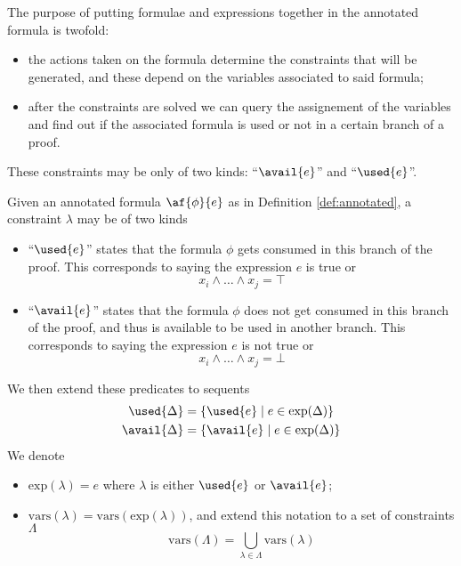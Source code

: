 \noindent The purpose of putting formulae and expressions together in the annotated formula is twofold:
\begin{itemize}
	\item the actions taken on the formula determine the constraints that will be generated, and these depend on the variables associated to said formula;
	\item after the constraints are solved we can query the assignement of the variables and find out if the associated formula is used or not in a certain branch of a proof.
\end{itemize}
These constraints may be only of two kinds: ``$\avail{e}$'' and ``$\used{e}$''.
\begin{define}[Constraints]
	\label{def:constraints}
	Given an annotated formula $\af{\phi}{e}$ as in Definition \ref{def:annotated}, a constraint $\lambda$ may be of two kinds
	\begin{itemize}
		\item ``$\used{e}$'' states that the formula $\phi$ gets consumed in this branch of the proof.
			This corresponds to saying the expression $e$ is true or
			$$ x_i \wedge \dots \wedge x_j = \top $$
		\item ``$\avail{e}$'' states that the formula $\phi$ does not get consumed in this branch of the proof, and thus is available to be used in another branch.
			This corresponds to saying the expression $e$ is not true or
			$$ x_i \wedge \dots \wedge x_j = \bot $$
	\end{itemize}
	We then extend these predicates to sequents
	\begin{align*}
		\used{\Delta} &= \{ \used{e} \mid e \in \mathrm{exp}(\Delta) \} \\
		\avail{\Delta} &= \{ \avail{e} \mid e \in \mathrm{exp}(\Delta) \}
	\end{align*}
	We denote
	\begin{itemize}
		\item $\mathrm{exp}(\lambda) = e$ where $\lambda$ is either $\used{e}$ or $\avail{e}$;
		\item $\mathrm{vars}(\lambda) = \mathrm{vars}(\mathrm{exp}(\lambda))$, and extend this notation to a set of constraints $\Lambda$
			$$ \mathrm{vars}(\Lambda) = \bigcup_{\lambda \in \Lambda} \mathrm{vars}(\lambda) $$
	\end{itemize}
\end{define}
